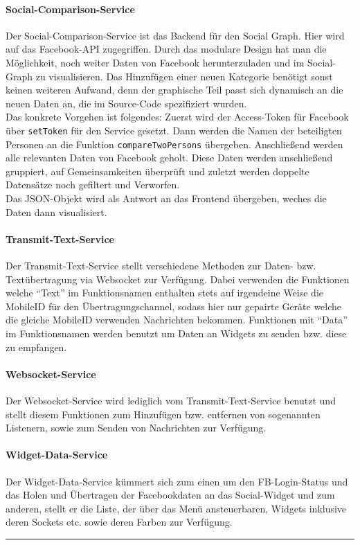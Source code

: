 \documentclass[10pt,a4paper]{report}
\newcommand{\HRule}{\rule{\linewidth}{0.1pt}} %
\begin{document}
				\paragraph{Social-Comparison-Service}
					Der Social-Comparison-Service ist das Backend für den Social Graph. Hier wird auf das Facebook-API zugegriffen. Durch das modulare Design hat man die Möglichkeit, noch weiter Daten von Facebook herunterzuladen und im Social-Graph zu visualisieren. Das Hinzufügen einer neuen Kategorie benötigt sonst keinen weiteren Aufwand, denn der graphische Teil passt sich dynamisch an die neuen Daten an, die im Source-Code spezifiziert wurden.\\
					Das konkrete Vorgehen ist folgendes: Zuerst wird der Access-Token für Facebook über \texttt{setToken} für den Service gesetzt. Dann werden die Namen der beteiligten Personen an die Funktion \texttt{compare\-Two\-Persons} übergeben. Anschließend werden alle relevanten Daten von Facebook geholt. Diese Daten werden anschließend gruppiert, auf Gemeinsamkeiten überprüft und zuletzt werden doppelte Datensätze noch gefiltert und Verworfen.\\
					Das JSON-Objekt wird als Antwort an das Frontend übergeben, weches die Daten dann visualisiert.
				\paragraph{Transmit-Text-Service}
					Der Transmit-Text-Service stellt verschiedene Methoden zur Daten- bzw. Textübertragung via Websocket zur Verfügung. Dabei verwenden die Funktionen welche "`Text"' im Funktionsnamen enthalten stets auf irgendeine Weise die MobileID für den Über\-trag\-ungs\-chan\-nel, sodass hier nur gepairte Geräte welche die gleiche MobileID verwenden Nachrichten bekommen. Funktionen mit "`Data"' im Funktionsnamen werden benutzt um Daten an Widgets zu senden bzw. diese zu empfangen.
				\paragraph{Websocket-Service}
					Der Websocket-Service wird lediglich vom Transmit-Text-Service benutzt und stellt diesem Funktionen zum Hinzufügen bzw. entfernen von sogenannten Listenern, sowie zum Senden von Nachrichten zur Verfügung.
				\paragraph{Widget-Data-Service}
					Der Widget-Data-Service kümmert sich zum einen um den FB-Login-Status und das Holen und Übertragen der Facebookdaten an das Social-Widget und zum anderen, stellt er die Liste, der über das Menü ansteuerbaren, Widgets inklusive deren Sockets etc. sowie deren Farben zur Verfügung.\\
					\HRule
\end{document}
